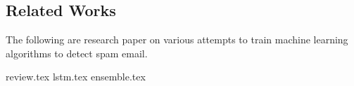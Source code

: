 \subsection{Related Works}
The following are research paper on various attempts to train machine learning algorithms to detect spam email.

{review.tex}
{lstm.tex}
{ensemble.tex}
